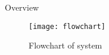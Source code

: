 \begin{frame}{Overview}
\begin{figure}[H]
	\begin{center}
	\texttt{[image: flowchart]}
	\caption{Flowchart of system}
	\end{center}
	\end{figure}
\end{frame}
